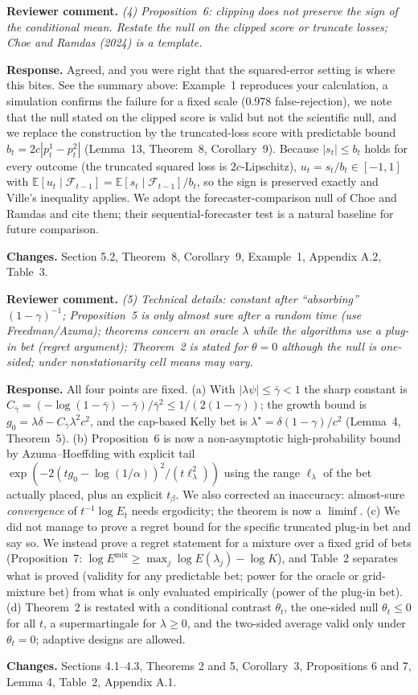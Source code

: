 \documentclass[11pt,a4paper]{article}
\newcommand{\rev}[1]{\par\noindent\textbf{Reviewer comment.} \emph{#1}}
\newcommand{\resp}{\par\noindent\textbf{Response.} }
\newcommand{\chg}{\par\noindent\textbf{Changes.} }
\begin{document}
\rev{(4) Proposition~6: clipping does not preserve the sign of the conditional mean. Restate the null on the clipped score or truncate losses; Choe and Ramdas (2024) is a template.}
\resp Agreed, and you were right that the squared-error setting is where this bites. See the summary above: Example~1 reproduces your calculation, a simulation confirms the failure for a fixed scale ($0.978$ false-rejection), we note that the null stated on the clipped score is valid but not the scientific null, and we replace the construction by the truncated-loss score with predictable bound $b_t=2c|p^1_t-p^2_t|$ (Lemma~13, Theorem~8, Corollary~9). Because $|s_t|\le b_t$ holds for every outcome (the truncated squared loss is $2c$-Lipschitz), $u_t=s_t/b_t\in[-1,1]$ with $\mathbb E[u_t\mid\mathcal F_{t-1}]=\mathbb E[s_t\mid\mathcal F_{t-1}]/b_t$, so the sign is preserved exactly and Ville's inequality applies. We adopt the forecaster-comparison null of Choe and Ramdas and cite them; their sequential-forecaster test is a natural baseline for future comparison.
\chg Section 5.2, Theorem~8, Corollary~9, Example~1, Appendix A.2, Table~3.

\rev{(5) Technical details: constant after ``absorbing'' $(1-\gamma)^{-1}$; Proposition~5 is only almost sure after a random time (use Freedman/Azuma); theorems concern an oracle $\lambda$ while the algorithms use a plug-in bet (regret argument); Theorem~2 is stated for $\theta=0$ although the null is one-sided; under nonstationarity cell means may vary.}
\resp All four points are fixed. (a) With $|\lambda\psi|\le\bar\gamma<1$ the sharp constant is $C_{\bar\gamma}=(-\log(1-\bar\gamma)-\bar\gamma)/\bar\gamma^2\le1/(2(1-\gamma))$; the growth bound is $g_0=\lambda\delta-C_{\bar\gamma}\lambda^2c^2$, and the cap-based Kelly bet is $\lambda^\star=\delta(1-\gamma)/c^2$ (Lemma~4, Theorem~5). (b) Proposition~6 is now a non-asymptotic high-probability bound by Azuma--Hoeffding with explicit tail $\exp(-2(tg_0-\log(1/\alpha))^2/(t\ell_\lambda^2))$ using the range $\ell_\lambda$ of the bet actually placed, plus an explicit $t_\beta$. We also corrected an inaccuracy: almost-sure \emph{convergence} of $t^{-1}\log E_t$ needs ergodicity; the theorem is now a $\liminf$. (c) We did not manage to prove a regret bound for the specific truncated plug-in bet and say so. We instead prove a regret statement for a mixture over a fixed grid of bets (Proposition~7: $\log E^{\mathrm{mix}}\ge\max_j\log E(\lambda_j)-\log K$), and Table~2 separates what is proved (validity for any predictable bet; power for the oracle or grid-mixture bet) from what is only evaluated empirically (power of the plug-in bet). (d) Theorem~2 is restated with a conditional contrast $\theta_t$, the one-sided null $\theta_t\le0$ for all $t$, a supermartingale for $\lambda\ge0$, and the two-sided average valid only under $\theta_t=0$; adaptive designs are allowed.
\chg Sections 4.1--4.3, Theorems 2 and 5, Corollary~3, Propositions 6 and 7, Lemma 4, Table~2, Appendix A.1.
\end{document}
